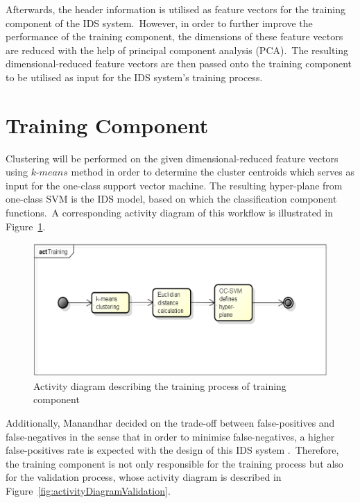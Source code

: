 		Afterwards, the header information is utilised as feature vectors for the training component of the IDS system.\ However, in order to further improve the performance of the training component, the dimensions of these feature vectors are reduced with the help of principal component analysis (PCA).\ The resulting dimensional-reduced feature vectors are then passed onto the training component to be utilised as input for the IDS system's training process. 

	\section{Training Component}
		
		Clustering will be performed on the given dimensional-reduced feature vectors using $k$-$means$ method in order to determine the cluster centroids which serves as input for the one-class support vector machine. The resulting hyper-plane from one-class SVM is the IDS model, based on which the classification component functions.\ A corresponding activity diagram of this workflow is illustrated in Figure~\ref{fig:activityDiagramTraining}.
		
		\begin{figure}[hb]
	 	 \centering
		  \includegraphics[scale=0.2068]{figures/ActivityDiagramTraining.png}
		  \caption{Activity diagram describing the training process of training component}
		  \label{fig:activityDiagramTraining}
		\end{figure}
				
		Additionally, Manandhar decided on the trade-off between false-positives and false-negatives in the sense that in order to minimise false-negatives, a higher false-positives rate is expected with the design of this IDS system \cite{Manandhar:TowardsPracticalAnomalyBasedIDS}.\ Therefore, the training component is not only responsible for the training process but also for the validation process, whose activity diagram is described in Figure~\ref{fig:activityDiagramValidation}.

